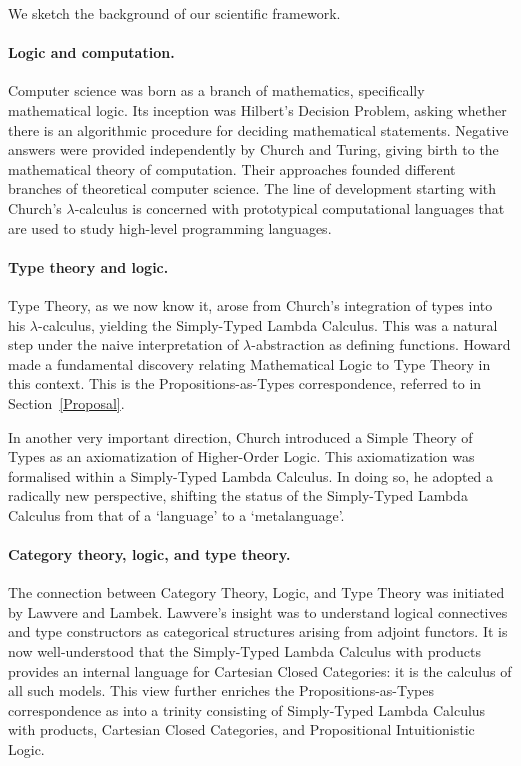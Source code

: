 \documentclass[11pt,twocolumn]{article}
\newcommand{\lcalculus}{\mbox{$\lambda$-calculus}}
\begin{document}
We sketch the background of our scientific framework.

\paragraph*{Logic and computation.}

Computer science was born as a branch of mathematics, specifically
mathematical logic.  Its inception was Hilbert's %
Decision Problem, asking whether there is an algorithmic procedure for
deciding mathematical statements.  Negative answers were provided
independently by Church %
and Turing, %
giving birth to the mathematical theory of computation.  Their approaches
founded different branches of theoretical computer science.  The line of
development starting with Church's {\lcalculus} %
is concerned with prototypical computational languages that are used to study
high-level programming languages.  

\paragraph*{Type theory and logic.}
\label{SectionATypeTheoryAndLogicParagraph}

Type Theory, as we now know it, arose from Church's integration of types into
his \lcalculus, yielding the Simply-Typed Lambda Calculus. %
This was a natural step under the naive interpretation of
\mbox{$\lambda$-abstraction} as defining functions.  Howard %
made a fundamental discovery relating Mathematical Logic to Type Theory in
this context.  This is the Propositions-as-Types correspondence, referred to
in Section~\ref{Proposal}.

In another very important direction, Church introduced a Simple Theory of
Types %
as an axiomatization of Higher-Order Logic.  This axiomatization was
formalised within a Simply-Typed Lambda Calculus.  In doing so, he adopted a
radically new perspective, shifting the status of the Simply-Typed Lambda
Calculus from that of a `language' to a `metalanguage'. 

\paragraph*{Category theory, logic, and type theory.}

The connection between Category Theory, Logic, and Type Theory was
initiated by Lawvere %
and Lambek. %
%
Lawvere's insight was to understand logical connectives and type constructors
as categorical structures arising from adjoint functors.  It is now
well-understood that the Simply-Typed Lambda Calculus with products provides
an internal language for Cartesian Closed Categories: it is the calculus of
all such models.  This view further enriches the Propositions-as-Types
correspondence as into a trinity consisting of Simply-Typed Lambda Calculus
with products, Cartesian Closed Categories, and Propositional Intuitionistic
Logic.
\end{document}
